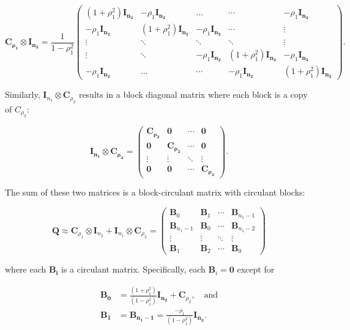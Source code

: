 \documentclass[
  12pt]{article}
\begin{document}
\[
\mathbf{C_{\rho_1}} \otimes \mathbf{I_{n_2}} = \frac{1}{1-\rho_1^2}
\begin{pmatrix}
(1+\rho_1^2)\mathbf{I_{n_2}} & -\rho_1\mathbf{I_{n_2}} & \dots & \cdots & -\rho_1\mathbf{I_{n_2}} \\
-\rho_1\mathbf{I_{n_2}} & (1+\rho_1^2)\mathbf{I_{n_2}} & -\rho_1 \mathbf{I_{n_2}} & \cdots & \vdots  \\
\vdots & \ddots & \ddots & \ddots & \vdots \\
\vdots & \ddots & -\rho_1\mathbf{I_{n_2}} & (1+\rho_1^2)\mathbf{I_{n_2}} & -\rho_1 \mathbf{I_{n_2}}  \\
-\rho_1\mathbf{I_{n_2}} & \dots & \cdots & -\rho_1 \mathbf{I_{n_2}} & (1+\rho_1^2)\mathbf{I_{n_2}}
\end{pmatrix}.
\]

Similarly, \(\mathbf I_{n_1} \otimes \mathbf C_{\rho_2}\) results in a
block diagonal matrix where each block is a copy of \(C_{\rho_2}\):

\[
\mathbf{I_{n_1}} \otimes \mathbf{C_{\rho_2}} = 
\begin{pmatrix}
\mathbf{C_{\rho_2}} & \mathbf{0} & \cdots & \mathbf{0} \\
\mathbf{0} & \mathbf{C_{\rho_2}} & \cdots & \mathbf{0} \\
\vdots & \vdots & \ddots & \vdots \\
\mathbf{0} & \mathbf{0} & \cdots & \mathbf{C_{\rho_2}}
\end{pmatrix}.
\]

The sum of these two matrices is a block-circulant matrix with circulant
blocks:

\[
\mathbf{Q} \approx \mathbf C_{\rho_1} \otimes \mathbf I_{n_2} + \mathbf I_{n_1} \otimes \mathbf C_{\rho_2} = 
\begin{pmatrix}
\mathbf{B}_0 & \mathbf{B}_1 & \cdots & \mathbf{B}_{n_1-1} \\
\mathbf{B}_{n_1-1} & \mathbf{B}_0 & \cdots & \mathbf{B}_{n_1-2} \\
\vdots & \vdots & \ddots & \vdots \\
\mathbf{B}_1 & \mathbf{B}_2 & \cdots & \mathbf{B}_0
\end{pmatrix}
\]

where each \(\mathbf{B_i}\) is a circulant matrix. Specifically, each
\(\mathbf B_i = \mathbf 0\) except for

\[
\begin{aligned}
\mathbf{B_0} &= \frac{(1+\rho_1^2)}{(1 - \rho_1^2)}\mathbf{I_{n_2}} + \mathbf C_{\rho_2}, \quad \text{and} \\
\mathbf{B_1} &= \mathbf{B_{n_1 - 1}} = \frac{-\rho_1}{(1 - \rho_1^2)}\mathbf{I_{n_2}}.
\end{aligned}
\]
\end{document}
